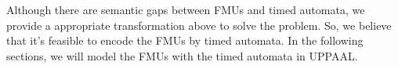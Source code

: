 %
Although there are semantic gaps between FMUs and timed automata, we provide a  appropriate transformation above to solve the problem. So, we believe that it's feasible to encode the FMUs by timed automata. In the following sections, we will model the FMUs with the timed automata in UPPAAL.


